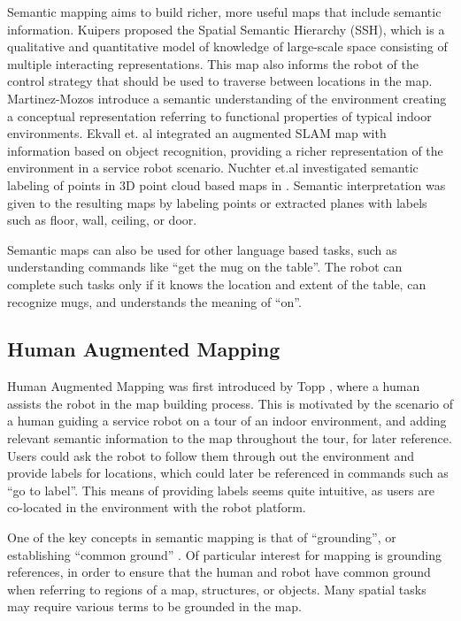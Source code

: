 \documentclass{tADR2e}
\begin{document}
Semantic mapping aims to build richer, more useful maps that include semantic information. Kuipers \cite{kuipers2000spatial} proposed the Spatial Semantic Hierarchy (SSH), which is
a qualitative and quantitative model of knowledge of large-scale space consisting of
multiple interacting representations. This map also informs the robot of the control
strategy that should be used to traverse between locations in the map. Martinez-Mozos \cite{mozos2005supervised} introduce a semantic understanding of
the environment creating a conceptual representation referring to functional properties of typical indoor environments. Ekvall et. al \cite{ekvall2007object} integrated an augmented SLAM map with information based on
object recognition, providing a richer representation of the environment in a service
robot scenario. Nuchter et.al investigated semantic labeling of points in 3D point cloud based
maps in \cite{nuchter2008towards}. Semantic interpretation was given to the resulting maps 
by labeling points or extracted planes with labels such as floor, wall, ceiling, or door.

Semantic maps can also be used for other language based tasks, such as understanding commands like “get the mug on the table”. The robot can complete such
tasks only if it knows the location and extent of the table, can recognize mugs, and understands the meaning of “on”.

\subsection{Human Augmented Mapping}
\label{sec:rel_human_augmented_mapping}

Human Augmented Mapping was first introduced by Topp \cite{topp2006topological}, 
where a human assists the robot in the map building
process. This is motivated by the scenario of a human guiding a service robot on a
tour of an indoor environment, and adding relevant semantic information to the map
throughout the tour, for later reference. Users could ask the robot to follow them
through out the environment and provide labels for locations, which could later be
referenced in commands such as “go to label”. This means of providing labels seems
quite intuitive, as users are co-located in the environment with the robot platform.

One of the key concepts in semantic mapping is that of “grounding”, or establishing 
“common ground” \cite{clark1991grounding}. Of particular interest for mapping is grounding references,
in order to ensure that the human and robot have common ground when referring
to regions of a map, structures, or objects. Many spatial tasks may require various
terms to be grounded in the map.
\end{document}
